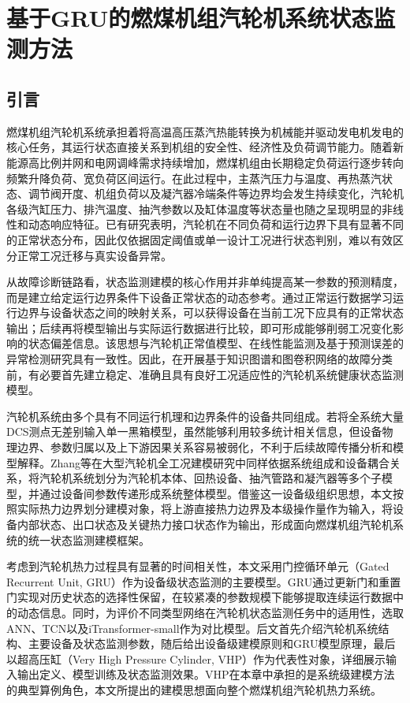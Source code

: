\section{基于GRU的燃煤机组汽轮机系统状态监测方法}
\label{sec:gru_monitoring_v2}

\subsection{引言}

燃煤机组汽轮机系统承担着将高温高压蒸汽热能转换为机械能并驱动发电机发电的核心任务，其运行状态直接关系到机组的安全性、经济性及负荷调节能力。随着新能源高比例并网和电网调峰需求持续增加，燃煤机组由长期稳定负荷运行逐步转向频繁升降负荷、宽负荷区间运行。在此过程中，主蒸汽压力与温度、再热蒸汽状态、调节阀开度、机组负荷以及凝汽器冷端条件等边界均会发生持续变化，汽轮机各级汽缸压力、排汽温度、抽汽参数以及缸体温度等状态量也随之呈现明显的非线性和动态响应特征。已有研究表明，汽轮机在不同负荷和运行边界下具有显著不同的正常状态分布，因此仅依据固定阈值或单一设计工况进行状态判别，难以有效区分正常工况迁移与真实设备异常\cite{Cao2016LastStageNormalValue,Dettori2017MonitoringModels,Chen2023AdaptiveTransfer}。

从故障诊断链路看，状态监测建模的核心作用并非单纯提高某一参数的预测精度，而是建立给定运行边界条件下设备正常状态的动态参考。通过正常运行数据学习运行边界与设备状态之间的映射关系，可以获得设备在当前工况下应具有的正常状态输出；后续再将模型输出与实际运行数据进行比较，即可形成能够削弱工况变化影响的状态偏差信息。该思想与汽轮机正常值模型、在线性能监测及基于预测误差的异常检测研究具有一致性\cite{Jiang2014DataReconciliation,Ko2022DynamicThresholdAE,Zhai2024CAEWarning}。因此，在开展基于知识图谱和图卷积网络的故障分类前，有必要首先建立稳定、准确且具有良好工况适应性的汽轮机系统健康状态监测模型。

汽轮机系统由多个具有不同运行机理和边界条件的设备共同组成。若将全系统大量DCS测点无差别输入单一黑箱模型，虽然能够利用较多统计相关信息，但设备物理边界、参数归属以及上下游因果关系容易被弱化，不利于后续故障传播分析和模型解释。Zhang等在大型汽轮机全工况建模研究中同样依据系统组成和设备耦合关系，将汽轮机系统划分为汽轮机本体、回热设备、抽汽管路和凝汽器等多个子模型，并通过设备间参数传递形成系统整体模型\cite{Zhang2018AllCondition}。借鉴这一设备级组织思想，本文按照实际热力边界划分建模对象，将上游直接热力边界及本级操作量作为输入，将设备内部状态、出口状态及关键热力接口状态作为输出，形成面向燃煤机组汽轮机系统的统一状态监测建模框架。

考虑到汽轮机热力过程具有显著的时间相关性，本文采用门控循环单元（Gated Recurrent Unit, GRU）作为设备级状态监测的主要模型。GRU通过更新门和重置门实现对历史状态的选择性保留，在较紧凑的参数规模下能够提取连续运行数据中的动态信息\cite{Cho2014GRU}。同时，为评价不同类型网络在汽轮机状态监测任务中的适用性，选取ANN、TCN以及iTransformer-small作为对比模型。后文首先介绍汽轮机系统结构、主要设备及状态监测参数，随后给出设备级建模原则和GRU模型原理，最后以超高压缸（Very High Pressure Cylinder, VHP）作为代表性对象，详细展示输入输出定义、模型训练及状态监测效果。VHP在本章中承担的是系统级建模方法的典型算例角色，本文所提出的建模思想面向整个燃煤机组汽轮机热力系统。

